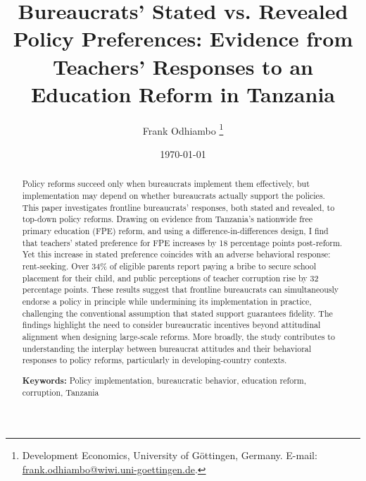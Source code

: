 \documentclass[hidelinks,12pt]{article}
\begin{document}
\begin{singlespace}

\begin{titlepage}
\title{Bureaucrats' Stated vs. Revealed Policy Preferences: Evidence from Teachers' Responses to an Education Reform in Tanzania}

\author{Frank Odhiambo \thanks{Development Economics, University of G\"ottingen, Germany. E-mail: \href{mailto:frank.odhiambo@wiwi.uni-goettingen.de}{frank.odhiambo@wiwi.uni-goettingen.de}.}}

\date{\today}
\maketitle
\begin{abstract}
\begin{singlespace}
Policy reforms succeed only when bureaucrats implement them effectively, but implementation may depend on whether bureaucrats actually support the policies. This paper investigates frontline bureaucrats’ responses, both stated and revealed, to top-down policy reforms. Drawing on evidence from Tanzania’s nationwide free primary education (FPE) reform, and using a difference-in-differences design, I find that teachers' stated preference for FPE increases by 18 percentage points post-reform. Yet this increase in stated preference coincides with an adverse behavioral response: rent-seeking. Over 34\% of eligible parents report paying a bribe to secure school placement for their child, and public perceptions of teacher corruption rise by 32 percentage points. These results suggest that frontline bureaucrats can simultaneously endorse a policy in principle while undermining its implementation in practice, challenging the conventional assumption that stated support guarantees fidelity. The findings highlight the need to consider bureaucratic incentives beyond attitudinal alignment when designing large-scale reforms. More broadly, the study contributes to understanding the interplay between bureaucrat attitudes and their behavioral responses to policy reforms, particularly in developing-country contexts.\\
\end{singlespace}

\textbf{Keywords:} Policy implementation, bureaucratic behavior, education reform, corruption, Tanzania \\


\end{abstract}
\end{titlepage}
\end{singlespace}
\end{document}

